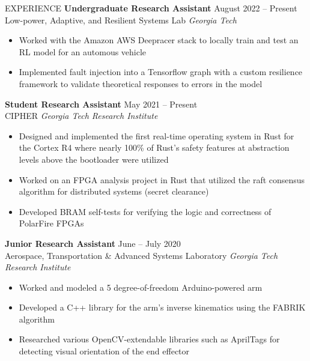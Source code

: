\documentclass{resume} %
\begin{document}
\vspace{-0.8em}
\begin{rSection}{EXPERIENCE}
\textbf{Undergraduate Research Assistant} \hfill August 2022 -- Present\\
Low-power, Adaptive, and Resilient Systems Lab \hfill \textit{Georgia Tech}
\vspace{-0.5em}
   \begin{itemize}
      \itemsep -5pt {} 
      \item Worked with the Amazon AWS Deepracer stack to locally train and test an RL model
      for an automous vehicle
      \item Implemented fault injection into a Tensorflow graph with a custom resilience framework
      to validate theoretical responses to errors in the model
   \end{itemize}
\vspace{-0.5em}
\textbf{Student Research Assistant} \hfill May 2021 -- Present\\
CIPHER \hfill \textit{Georgia Tech Research Institute}
\vspace{-0.5em}
 \begin{itemize}
    \itemsep -5pt {} 
     \item Designed and implemented the first real-time operating system in Rust for the Cortex R4 where
     nearly 100\% of Rust's safety features at abstraction levels above the bootloader were utilized
     \item Worked on an FPGA analysis project in Rust that utilized the raft consensus algorithm for distributed systems (secret clearance)
     \item Developed BRAM self-tests for verifying the logic and correctness of PolarFire FPGAs
 \end{itemize}
\vspace{-0.5em}
\textbf{Junior Research Assistant} \hfill June -- July 2020\\
Aerospace, Transportation \& Advanced Systems Laboratory \hfill \textit{Georgia Tech Research Institute}
\vspace{-0.5em}
 \begin{itemize}
    \itemsep -5pt {} 
     \item Worked and modeled a 5 degree-of-freedom Arduino-powered arm
     \item Developed a C++ library for the arm's inverse kinematics using the FABRIK algorithm
     \item Researched various OpenCV-extendable libraries such as AprilTags for detecting visual orientation of the end effector

\end{itemize}
\end{rSection}
\end{document}
